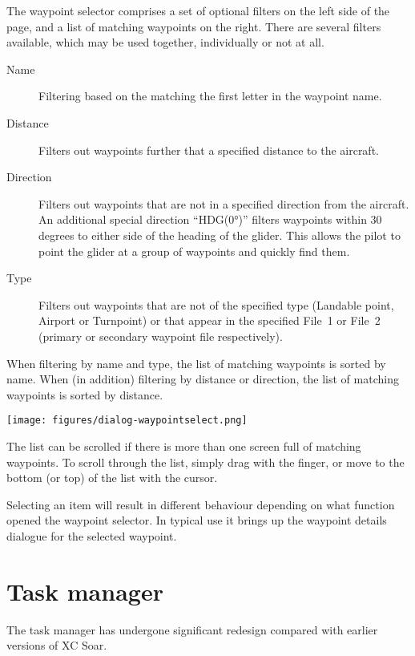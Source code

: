 The waypoint selector comprises a set of optional filters on the left
side of the page, and a list of matching waypoints on the right.
There are several filters available, which may be used together,
individually or not at all.
\begin{description}
\item[Name] Filtering based on the matching the first letter in the waypoint name. 
\item[Distance] Filters out waypoints further that a specified distance to the 
  aircraft.
\item[Direction] Filters out waypoints that are not in a specified direction 
  from the aircraft. 
  An additional special direction ``HDG(0°)'' filters waypoints within 30
  degrees to either side of the heading of the glider.  This allows the pilot 
  to point the glider at a group of waypoints and quickly find them.
\item[Type] Filters out waypoints that are not of the specified type
(Landable point, Airport or Turnpoint) or that appear in the specified File~1 or
File~2 (primary or secondary waypoint file respectively).
\end{description}
When filtering by name and type, the list of matching waypoints is
sorted by name. When (in addition) filtering by distance or direction,
 the list of matching waypoints is sorted by distance.

\begin{center}
\texttt{[image: figures/dialog-waypointselect.png]}
\end{center}

The list can be scrolled if there is more than one screen full of
matching waypoints.  To scroll through the list, simply drag with the finger, or
move to the bottom (or top) of the list with the cursor.   

Selecting an item will result in different behaviour
depending on what function opened the waypoint selector.  In typical
use it brings up the waypoint details dialogue for the selected
waypoint.

\section{Task manager}\label{sec:task-manager-dialog}
\begin{it}  The task manager has undergone significant redesign compared with 
earlier versions of XC Soar.\end{it}

